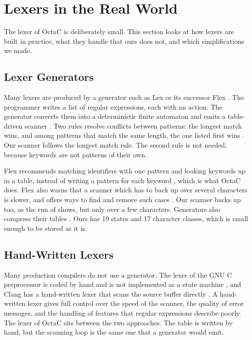 \section{Lexers in the Real World}
\label{sec:lexers-real-world}

The lexer of OctaC is deliberately small. This section looks at how lexers
are built in practice, what they handle that ours does not, and which
simplifications we made.

\subsection{Lexer Generators}

Many lexers are produced by a generator such as Lex \cite{aho2006compilers} or
its successor Flex \cite{flex-manual}. The programmer writes a list of regular
expressions, each with an action. The generator converts them into a
deterministic finite automaton and emits a table-driven scanner
\cite{aho2006compilers}. Two rules resolve conflicts between patterns: the
longest match wins, and among patterns that match the same length, the one
listed first wins \cite{aho2006compilers,flex-manual}. Our scanner follows the
longest match rule. The second rule is not needed, because keywords are not
patterns of their own.

Flex recommends matching identifiers with one pattern and looking keywords up
in a table, instead of writing a pattern for each keyword
\cite{flex-manual}, which is what OctaC does. Flex also warns that a scanner
which has to back up over several characters is slower, and offers ways to
find and remove such cases \cite{flex-manual}. Our scanner backs up too, as the
run of  shows, but only over a few characters. Generators also
compress their tables \cite{aho2006compilers}. Ours has 19 states and 17
character classes, which is small enough to be stored as it is.

\subsection{Hand-Written Lexers}

Many production compilers do not use a generator. The lexer of the GNU C
preprocessor is coded by hand and is not implemented as a state machine
\cite{gcc-cppinternals}, and Clang has a hand-written lexer that scans the
source buffer directly \cite{clang-internals}. A hand-written lexer gives full
control over the speed of the scanner, the quality of error messages, and the
handling of features that regular expressions describe poorly. The lexer of
OctaC sits between the two approaches. The table is written by hand, but the
scanning loop is the same one that a generator would emit.

